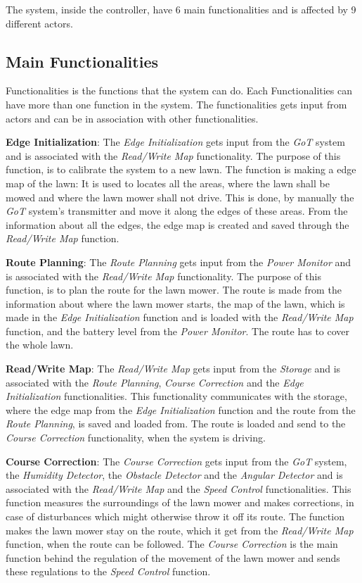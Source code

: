 \noindent
\newpage
The system, inside the controller, have 6 main functionalities and is affected by 9 different actors.


\subsection{Main Functionalities}

Functionalities is the functions that the system can do. Each Functionalities can have more than one function in the system. The functionalities gets input from actors and can be in association with other functionalities. 

\textbf{Edge Initialization}:
The \textit{Edge Initialization} gets input from the \textit{GoT} system and is associated with the \textit{Read/Write Map} functionality. The purpose of this function, is to calibrate the system to a new lawn. The function is making a edge map of the lawn: It is used to locates all the areas, where the lawn shall be mowed and where the lawn mower shall not drive. This is done, by manually the \textit{GoT} system's transmitter and move it along the edges of these areas. From the information about all the edges, the edge map is created and saved through the \textit{Read/Write Map} function.

\textbf{Route Planning}:
The \textit{Route Planning} gets input from the \textit{Power Monitor} and is associated with the \textit{Read/Write Map} functionality. The purpose of this function, is to plan the route for the lawn mower. The route is made from the information about where the lawn mower starts, the map of the lawn, which is made in the \textit{Edge Initialization} function and is loaded with the \textit{Read/Write Map} function, and the battery level from the \textit{Power Monitor}. The route has to cover the whole lawn.

\textbf{Read/Write Map}:
The \textit{Read/Write Map} gets input from the \textit{Storage} and is associated with the \textit{Route Planning}, \textit{Course Correction} and the \textit{Edge Initialization} functionalities. This functionality communicates with the storage, where the edge map from the \textit{Edge Initialization} function and the route from the \textit{Route Planning}, is saved and loaded from. The route is loaded and send to the \textit{Course Correction} functionality, when the system is driving.

\textbf{Course Correction}:
The \textit{Course Correction} gets input from the \textit{GoT} system, the \textit{Humidity Detector}, the \textit{Obstacle Detector} and the \textit{Angular Detector} and is associated with the \textit{Read/Write Map} and the \textit{Speed Control} functionalities. This function measures the surroundings of the lawn mower and makes corrections, in case of disturbances which might otherwise throw it off its route. The function makes the lawn mower stay on the route, which it get from the \textit{Read/Write Map} function, when the route can be followed. The \textit{Course Correction} is the main function behind the regulation of the movement of the lawn mower and sends these regulations to the \textit{Speed Control} function.

